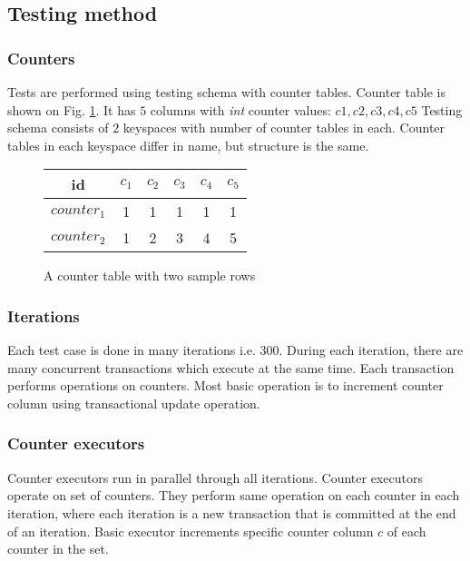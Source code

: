 \subsection{Testing method}

\subsubsection{Counters}
Tests are performed using testing schema with counter tables. Counter table is shown on Fig. \ref{fig:counterTable}. It has $5$ columns with \emph{int} counter values: $c1,c2,c3,c4,c5$
Testing schema consists of $2$ keyspaces with number of counter tables in each. Counter tables in each keyspace differ in name, but structure is the same.

\begin{figure}[h]
\centering
\begin{tabular}{c||c|c|c|c|c}
        \toprule
        id 		 & $c_{1}$ & $c_{2}$ & $c_{3}$ & $c_{4}$ & $c_{5}$ \\ \midrule
        $counter_{1}$ & 1  & 1  & 1  &  1 & 1  \\
        $counter_{2}$ & 1  & 2  & 3  &  4 & 5  \\ \bottomrule
      \end{tabular}
      \caption{A counter table with two sample rows}
  \label{fig:counterTable}
\end{figure}

\subsubsection{Iterations}
Each test case is done in many iterations i.e. $300$. During each iteration, there are many concurrent transactions which execute at the same time. Each transaction performs operations on counters. Most basic operation is to increment counter column using transactional update operation.

\subsubsection{Counter executors}
Counter executors run in parallel through all iterations. 
Counter executors operate on set of counters. They perform same operation on each counter in each iteration, where each iteration is a new transaction that is committed at the end of an iteration. 
Basic executor increments specific counter column $c$ of each counter in the set.

